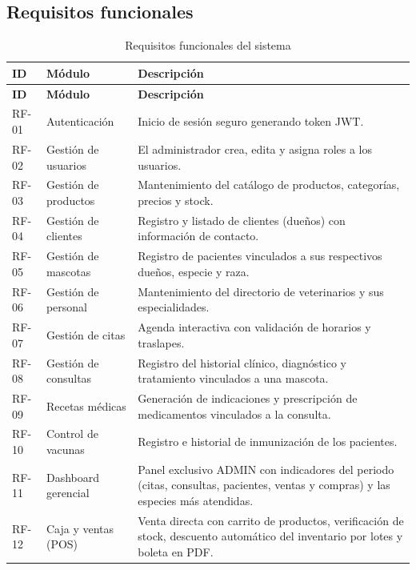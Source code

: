 \documentclass[11pt,a4paper]{report}
\begin{document}
\subsection{Requisitos funcionales}
\begin{longtable}{@{}p{1.5cm} p{3.5cm} p{10.0cm}@{}}
\caption{Requisitos funcionales del sistema}\label{tab:rf}\\
\toprule
\textbf{ID} & \textbf{Módulo} & \textbf{Descripción} \\
\midrule
\endfirsthead
\toprule
\textbf{ID} & \textbf{Módulo} & \textbf{Descripción} \\
\midrule
\endhead
\bottomrule
\endfoot
RF-01 & Autenticación & Inicio de sesión seguro generando token JWT. \\
\addlinespace
RF-02 & Gestión de usuarios & El administrador crea, edita y asigna roles a los usuarios. \\
\addlinespace
RF-03 & Gestión de productos & Mantenimiento del catálogo de productos, categorías, precios y stock. \\
\addlinespace
RF-04 & Gestión de clientes & Registro y listado de clientes (dueños) con información de contacto. \\
\addlinespace
RF-05 & Gestión de mascotas & Registro de pacientes vinculados a sus respectivos dueños, especie y raza. \\
\addlinespace
RF-06 & Gestión de personal & Mantenimiento del directorio de veterinarios y sus especialidades. \\
\addlinespace
RF-07 & Gestión de citas & Agenda interactiva con validación de horarios y traslapes. \\
\addlinespace
RF-08 & Gestión de consultas & Registro del historial clínico, diagnóstico y tratamiento vinculados a una mascota. \\
\addlinespace
RF-09 & Recetas médicas & Generación de indicaciones y prescripción de medicamentos vinculados a la consulta. \\
\addlinespace
RF-10 & Control de vacunas & Registro e historial de inmunización de los pacientes. \\
\addlinespace
RF-11 & Dashboard gerencial & Panel exclusivo ADMIN con indicadores del periodo (citas, consultas, pacientes, ventas y compras) y las especies más atendidas. \\
\addlinespace
RF-12 & Caja y ventas (POS) & Venta directa con carrito de productos, verificación de stock, descuento automático del inventario por lotes y boleta en PDF. \\

\end{longtable}
\end{document}
